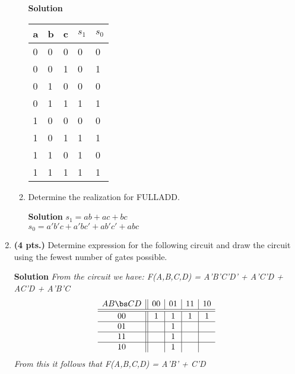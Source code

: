 \begin{enumerate}
\begin{enumerate}
\begin{onlysolution}  \textbf{Solution} \itshape{
	\begin{tabular}{l|l|l|l|l}
	a & b & c & $s_1$ & $s_0$ \\ \hline
	0 & 0 & 0 & 0   & 0   \\ \hline
	0 & 0 & 1 & 0   & 1   \\ \hline
	0 & 1 & 0 & 0   & 0   \\ \hline
	0 & 1 & 1 & 1   & 1   \\ \hline
	1 & 0 & 0 & 0   & 0   \\ \hline
	1 & 0 & 1 & 1   & 1   \\ \hline
	1 & 1 & 0 & 1   & 0   \\ \hline
	1 & 1 & 1 & 1   & 1   \\ 
\end{tabular}
} \end{onlysolution} 
        \item Determine the \SOPmin realization for FULLADD.

\begin{onlysolution}  \textbf{Solution} \itshape{
$s_1 = ab + ac + bc $ \\
$s_0 = a'b'c + a'bc' + ab'c' + abc $
} \end{onlysolution} 
\end{enumerate}

\item  \textbf{ (4 pts.)} Determine \SOPmin expression for the following circuit
and draw the circuit using the fewest number of gates possible.
\begin{figure}[ht]
\label{fig:Hw3}
\end{figure}

\begin{onlysolution}  \textbf{Solution} \itshape{
From the circuit we have:
F(A,B,C,D) = A'B'C'D' + A'C'D + AC'D + A'B'C
$$ \begin{array} {c||c|c|c|c}
       AB \bs CD & 00 & 01 & 11 & 10 \\ \hline \hline
       00        & 1  & 1  & 1  & 1  \\ \hline
       01        &    & 1  &    &    \\ \hline
       11        &    & 1  &    &    \\ \hline
       10        &    & 1  &    &    \\
\end{array} $$ 
From this it follows that 
F(A,B,C,D) =  A'B' + C'D
} \end{onlysolution} 


\end{enumerate}
